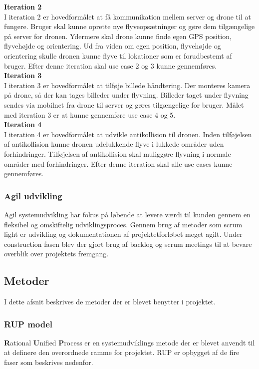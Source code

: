 \textbf{Iteration 2}\\
I iteration 2 er hovedformålet at få kommunikation mellem server og drone til at fungere. Bruger skal kunne oprette nye flyveopsætninger og gøre dem tilgængelige på server for dronen. Ydermere skal drone kunne finde egen GPS position, flyvehøjde og orientering. Ud fra viden om egen position, flyvehøjde og orientering skulle dronen kunne flyve til lokationer som er forudbestemt af bruger. Efter denne iteration skal use case 2 og 3 kunne gennemføres. \\

\textbf{Iteration 3}\\
I iteration 3 er hovedformålet at tilføje billede håndtering. Der monteres kamera på drone, så der kan tages billeder under flyvning. Billeder taget under flyvning sendes via mobilnet fra drone til server og gøres tilgængelige for bruger. Målet med iteration 3 er at kunne gennemføre use case 4 og 5. \\

\textbf{Iteration 4}\\
I iteration 4 er hovedformålet at udvikle antikollision til dronen. Inden tilføjelsen af antikollision kunne dronen udelukkende flyve i lukkede områder uden forhindringer. Tilføjelsen af antikollision skal muliggøre flyvning i normale områder med forhindringer. Efter denne iteration skal alle use cases kunne gennemføres.


\subsubsection*{Agil udvikling}
Agil systemudvikling har fokus på løbende at levere værdi til kunden gennem en fleksibel og omskiftelig udviklingsproces. Gennem brug af metoder som scrum light er udvikling og dokumentationen af projektetforløbet meget agilt. Under construction fasen blev der gjort brug af backlog og scrum meetings til at bevare overblik over projektets fremgang.


\newpage
\subsection{Metoder}
I dette afsnit beskrives de metoder der er blevet benytter i projektet.

\subsubsection*{RUP model}
\textbf{R}ational \textbf{U}nified \textbf{P}rocess er en systemudviklings metode der er blevet anvendt til at definere den overordnede ramme for projektet. RUP er opbygget af de fire faser som beskrives nedenfor.  

